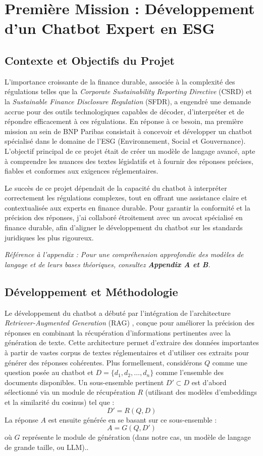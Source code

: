\documentclass[13pt,a4paper]{article}
\begin{document}
\section{\Large \bf Première Mission : Développement d'un Chatbot Expert en ESG}

\subsection{Contexte et Objectifs du Projet}

L'importance croissante de la finance durable, associée à la complexité des régulations telles que la \textit{Corporate Sustainability Reporting Directive } (CSRD) et la \textit{Sustainable Finance Disclosure Regulation} (SFDR), a engendré une demande accrue pour des outils technologiques capables de décoder, d'interpréter et de répondre efficacement à ces régulations. En réponse à ce besoin, ma première mission au sein de BNP Paribas consistait à concevoir et développer un chatbot spécialisé dans le domaine de l'ESG (Environnement, Social et Gouvernance). L'objectif principal de ce projet était de créer un modèle de langage avancé, apte à comprendre les nuances des textes législatifs et à fournir des réponses précises, fiables et conformes aux exigences réglementaires.

Le succès de ce projet dépendait de la capacité du chatbot à interpréter correctement les régulations complexes, tout en offrant une assistance claire et contextualisée aux experts en finance durable. Pour garantir la conformité et la précision des réponses, j'ai collaboré étroitement avec un avocat spécialisé en finance durable, afin d'aligner le développement du chatbot sur les standards juridiques les plus rigoureux.

\textit{Référence à l'appendix : Pour une compréhension approfondie des modèles de langage et de leurs bases théoriques, consultez \textbf{Appendix A et B}.}

\subsection{Développement et Méthodologie}

Le développement du chatbot a débuté par l'intégration de l'architecture \textit{Retriever-Augmented Generation} (RAG) \cite{RAG2020}, conçue pour améliorer la précision des réponses en combinant la récupération d'informations pertinentes avec la génération de texte. Cette architecture permet d'extraire des données importantes à partir de vastes corpus de textes réglementaires et d'utiliser ces extraits pour générer des réponses cohérentes. Plus formellement, considérons $Q$ comme une question posée au chatbot et $D = \{d_1, d_2, \dots, d_n\}$ comme l'ensemble des documents disponibles. Un sous-ensemble pertinent $D' \subset D$ est d'abord sélectionné via un module de récupération $R$ (utilisant des modèles d'embeddings et la similarité du cosinus) tel que :
\[
D' = R(Q, D)
\]
La réponse $A$ est ensuite générée en se basant sur ce sous-ensemble :
\[
A = G(Q, D')
\]
où $G$ représente le module de génération (dans notre cas, un modèle de langage de grande taille, ou LLM)\cite{Transformer2017}..
\end{document}
